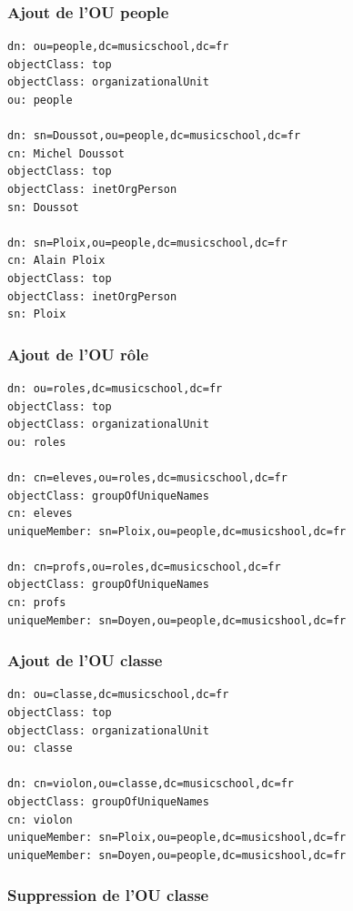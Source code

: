 \documentclass[12pt,a4paper,notitlepage]{article}
\begin{document}
\subsubsection{Ajout de l'OU people}

\begin{lstlisting}[title=people.ldif]
dn: ou=people,dc=musicschool,dc=fr
objectClass: top
objectClass: organizationalUnit
ou: people

dn: sn=Doussot,ou=people,dc=musicschool,dc=fr
cn: Michel Doussot
objectClass: top
objectClass: inetOrgPerson
sn: Doussot

dn: sn=Ploix,ou=people,dc=musicschool,dc=fr
cn: Alain Ploix
objectClass: top
objectClass: inetOrgPerson
sn: Ploix
\end{lstlisting}

\subsubsection{Ajout de l'OU rôle}

\begin{lstlisting}[title=role.ldif]
dn: ou=roles,dc=musicschool,dc=fr
objectClass: top
objectClass: organizationalUnit
ou: roles

dn: cn=eleves,ou=roles,dc=musicschool,dc=fr
objectClass: groupOfUniqueNames
cn: eleves
uniqueMember: sn=Ploix,ou=people,dc=musicshool,dc=fr

dn: cn=profs,ou=roles,dc=musicschool,dc=fr
objectClass: groupOfUniqueNames
cn: profs
uniqueMember: sn=Doyen,ou=people,dc=musicshool,dc=fr
\end{lstlisting}

\subsubsection{Ajout de l'OU classe}

\begin{lstlisting}[title=classe.ldif]
dn: ou=classe,dc=musicschool,dc=fr
objectClass: top
objectClass: organizationalUnit
ou: classe

dn: cn=violon,ou=classe,dc=musicschool,dc=fr
objectClass: groupOfUniqueNames
cn: violon
uniqueMember: sn=Ploix,ou=people,dc=musicshool,dc=fr
uniqueMember: sn=Doyen,ou=people,dc=musicshool,dc=fr
\end{lstlisting}

\subsubsection{Suppression de l'OU classe}
\end{document}
